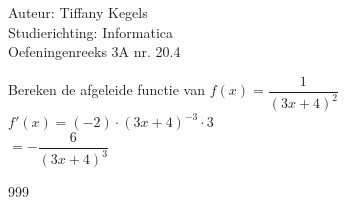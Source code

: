 \documentclass[a4paper]{article}
\begin{document}
  
\noindent \large Auteur: Tiffany Kegels \\
\noindent \large Studierichting: Informatica\\
\noindent \large Oefeningenreeks 3A nr. 20.4\\

\medskip

\normalsize

Bereken de afgeleide functie van $f(x) = \dfrac{1}{(3x+4)^2}$\\

$f'(x) = (-2) \cdot (3x+4)^{-3} \cdot 3$\\

$= -\dfrac{6}{(3x+4)^3}$



\begin{thebibliography}{999}

\end{thebibliography}
\end{document}
